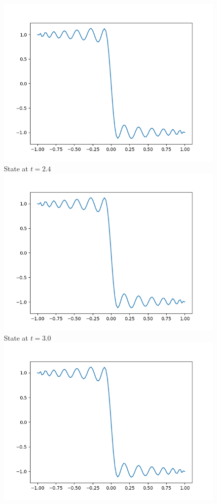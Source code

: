 \documentclass[a4paper,8pt]{article}
\begin{document}
\begin{figure}[h!]
\begin{multicols}{2}
\centering
\includegraphics[width=1\linewidth]{t2.4_plot.png}\\
State at $t=2.4$
\includegraphics[width=1\linewidth]{t3.0_plot.png}\\
State at $t=3.0$
\includegraphics[width=1\linewidth]{t3.6_plot.png}\\

\end{multicols}
\end{figure}
\end{document}

